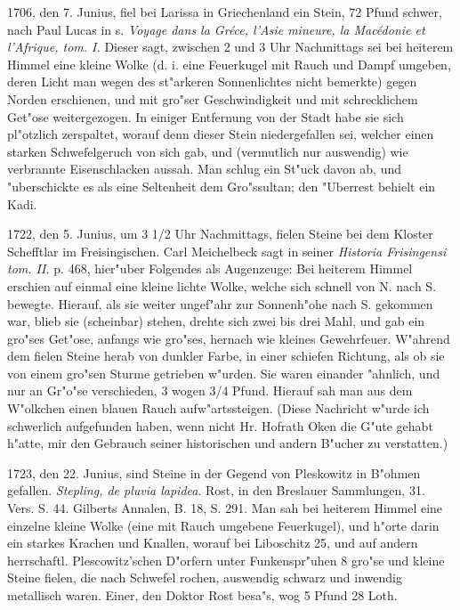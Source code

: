 \documentclass[a4paper, 11pt, oneside, polutonikogreek, german]{article}
\begin{document}
1706, den 7. Junius, fiel bei Larissa in Griechenland ein Stein, 72 Pfund schwer, nach Paul Lucas in s. \emph{Voyage dans la Gréce, l'Asie mineure, la Macédonie et l'Afrique, tom. I.} Dieser sagt, zwischen 2 und 3 Uhr Nachmittags sei bei heiterem Himmel eine kleine Wolke (d. i. eine Feuerkugel mit Rauch und Dampf umgeben, deren Licht man wegen des st"arkeren Sonnenlichtes nicht bemerkte) gegen Norden erschienen, und mit gro"ser Geschwindigkeit und mit schrecklichem Get"ose weitergezogen. In einiger Entfernung von der Stadt habe sie sich pl"otzlich zerspaltet, worauf denn dieser Stein niedergefallen sei, welcher einen starken Schwefelgeruch von sich gab, und (vermutlich nur auswendig) wie verbrannte Eisenschlacken aussah. Man schlug ein St"uck davon ab, und "uberschickte es als eine Seltenheit dem Gro"ssultan; den "Uberrest behielt ein Kadi.

1722, den 5. Junius, um 3 1/2 Uhr Nachmittags, fielen Steine bei dem Kloster Schefftlar im Freisingischen. Carl Meichelbeck sagt in seiner \emph{Historia Frisingensi tom. II.} p. 468, hier"uber Folgendes als Augenzeuge: Bei heiterem Himmel erschien auf einmal eine kleine lichte Wolke, welche sich schnell von N. nach S. bewegte. Hierauf, als sie weiter ungef"ahr zur Sonnenh"ohe nach S. gekommen war, blieb sie (scheinbar) stehen, drehte sich zwei bis drei Mahl, und gab ein gro"ses Get"ose, anfangs wie gro"ses, hernach wie kleines Gewehrfeuer. W"ahrend dem fielen Steine herab von dunkler Farbe, in einer schiefen Richtung, als ob sie von einem gro"sen Sturme getrieben w"urden. Sie waren einander "ahnlich, und nur an Gr"o"se verschieden, 3 wogen 3/4 Pfund. Hierauf sah man aus dem W"olkchen einen blauen Rauch aufw"artssteigen. (Diese Nachricht w"urde ich schwerlich aufgefunden haben, wenn nicht Hr. Hofrath Oken die G"ute gehabt h"atte, mir den Gebrauch seiner historischen und andern B"ucher zu verstatten.)

1723, den 22. Junius, sind Steine in der Gegend von Pleskowitz in B"ohmen gefallen. \emph{Stepling, de pluvia lapidea}. Rost, in den Breslauer Sammlungen, 31. Vers. S. 44. Gilberts Annalen, B. 18, S. 291. Man sah bei heiterem Himmel eine einzelne kleine Wolke (eine mit Rauch umgebene Feuerkugel), und h"orte darin ein starkes Krachen und Knallen, worauf bei Liboschitz 25, und auf andern herrschaftl. Plescowitz'schen D"orfern unter Funkenspr"uhen 8 gro"se und kleine Steine fielen, die nach Schwefel rochen, auswendig schwarz und inwendig metallisch waren. Einer, den Doktor Rost besa"s, wog 5 Pfund 28 Loth.
\end{document}
